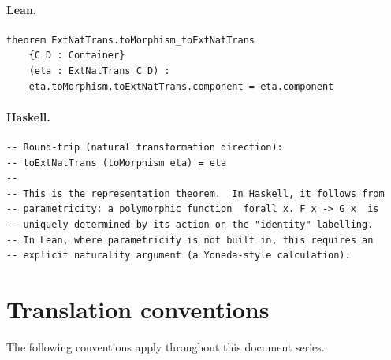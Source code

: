 \documentclass[11pt,a4paper]{article}
\begin{document}
\paragraph{Lean.}
\begin{lstlisting}[style=lean]
theorem ExtNatTrans.toMorphism_toExtNatTrans
    {C D : Container}
    (eta : ExtNatTrans C D) :
    eta.toMorphism.toExtNatTrans.component = eta.component
\end{lstlisting}

\paragraph{Haskell.}
\begin{lstlisting}[style=haskell]
-- Round-trip (natural transformation direction):
-- toExtNatTrans (toMorphism eta) = eta
--
-- This is the representation theorem.  In Haskell, it follows from
-- parametricity: a polymorphic function  forall x. F x -> G x  is
-- uniquely determined by its action on the "identity" labelling.
-- In Lean, where parametricity is not built in, this requires an
-- explicit naturality argument (a Yoneda-style calculation).
\end{lstlisting}


\section{Translation conventions}

The following conventions apply throughout this document series.
\end{document}
